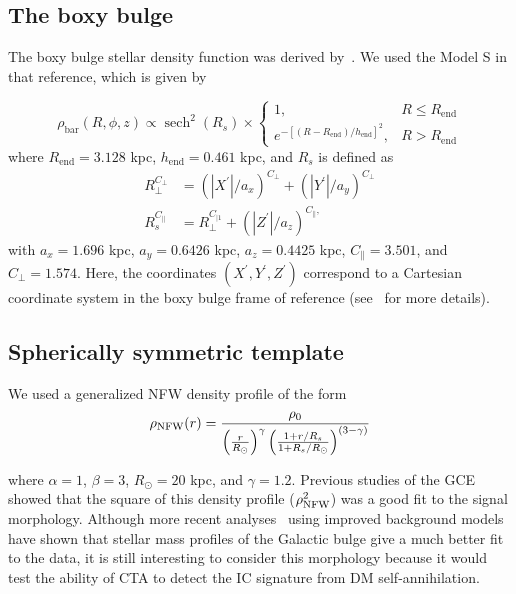 \documentclass[doublespace,draft,nopageskip]{VTthesis} %
\begin{document}
\begin{appendices}
\subsection{The boxy bulge}

The boxy bulge stellar density function was derived by~\cite{Freudenreich:1998}. We used the Model S in that reference, which is given by

\begin{equation}
\rho_{\mathrm{bar}}(R, \phi, z) \propto  \operatorname{sech}^{2}\left(R_{s}\right)
 \times\left\{
 \begin{array}{lr}
1, & R \leq R_{\mathrm{end}} \\
e^{-\left[\left(R-R_{\mathrm{end}}\right) / h_{\mathrm{end}}\right]^{2}}, & R>R_{\mathrm{end}}
\end{array}\right.\label{eq:boxybulge}
\end{equation}
where $R_{\mathrm{end}}=3.128$ kpc, $h_{\mathrm{end}}=0.461$ kpc, and $R_s$ is defined as
\begin{equation}
\begin{aligned}
R_{\perp}^{C_{\perp}} &=\left(\left|X^{\prime}\right| / a_{x}\right)^{C_{\perp}}+\left(\left|Y^{\prime}\right| / a_{y}\right)^{C_{\perp}} \\
R_{s}^{C_{\|}} &=R_{\perp}^{C_{\mid 1}}+\left(\left|Z^{\prime}\right| / a_{z}\right)^{C_{\|},}
\end{aligned}    
\end{equation}
with  $a_{x}=1.696$ kpc, $a_{y}=0.6426$ kpc, $a_{z}=0.4425$ kpc, $C_{\|}=3.501$, and $C_{\perp}=1.574$.  Here, the coordinates $(X^\prime,Y^\prime,Z^\prime)$ correspond to a Cartesian coordinate system in the boxy bulge frame of reference (see~\citealt{Song:2019nrx} for more details).

\subsection{Spherically symmetric template}

We used a generalized NFW density profile of the form 
\begin{equation}\label{eq:NFW}
    \rho_{\rm NFW}(r)=\frac{\rho_{0}}{\left(\frac{r}{R_{\odot}}\right)^{\gamma}\left(\frac{1+r / R_{s}}{1+R_{s} / R_{\odot}}\right)^{(3-\gamma)}}
\end{equation}

where $\alpha=1$, $\beta=3$, $R_{\odot}=20$ kpc, and $\gamma=1.2$. Previous studies of the GCE~\citep{Abazajian:2012pn,Gordon:2013vta,Daylan:2014rsa,Calore:2015bsx} showed that the square of this density profile ($\rho^2_{\rm NFW}$)  was a good fit to the signal morphology. Although more recent analyses~\citep{Macias:2016nev,Bartels:2017vsx,Macias:2019omb,Abazajian:2020tww} using improved background models have shown that stellar mass profiles of the Galactic bulge give a much better fit to the data, it is still interesting to consider this morphology because it  would test the ability of CTA to detect the IC signature from DM self-annihilation.


\end{appendices}
\end{document}
